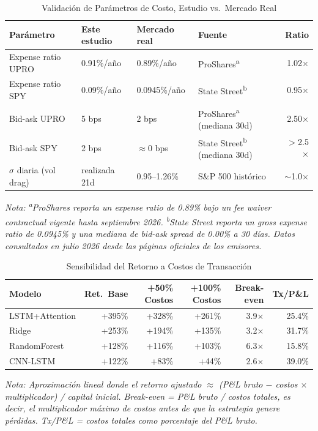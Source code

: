 

\begin{table}[H]
\centering
\caption{Validaci\'on de Par\'ametros de Costo, Estudio vs.\ Mercado Real}
\label{tab:cost_validation}
\small
\begin{tabular}{@{}llllr@{}}
\toprule
\textbf{Par\'ametro} & \textbf{Este estudio} & \textbf{Mercado real} & \textbf{Fuente} & \textbf{Ratio} \\
\midrule
Expense ratio UPRO & 0.91\%/a\~no & 0.89\%/a\~no & ProShares\textsuperscript{a} & 1.02$\times$ \\
Expense ratio SPY & 0.09\%/a\~no & 0.0945\%/a\~no & State Street\textsuperscript{b} & 0.95$\times$ \\
Bid-ask UPRO & 5 bps & 2 bps & ProShares\textsuperscript{a} (mediana 30d) & 2.50$\times$ \\
Bid-ask SPY & 2 bps & $\approx$0 bps & State Street\textsuperscript{b} (mediana 30d) & $>$2.5$\times$ \\
$\sigma$ diaria (vol drag) & realizada 21d & 0.95--1.26\% & S\&P 500 hist\'orico & $\sim$1.0$\times$ \\
\bottomrule
\end{tabular}
\vspace{0.2cm}
\parbox{0.9\textwidth}{\footnotesize\textit{Nota: \textsuperscript{a}ProShares reporta un expense ratio de 0.89\% bajo un fee waiver contractual vigente hasta septiembre 2026. \textsuperscript{b}State Street reporta un gross expense ratio de 0.0945\% y una mediana de bid-ask spread de 0.00\% a 30 d\'ias. Datos consultados en julio 2026 desde las p\'aginas oficiales de los emisores.}}
\end{table}

\begin{table}[H]
\centering
\caption{Sensibilidad del Retorno a Costos de Transacci\'on}
\label{tab:cost_sensitivity}
\small
\begin{tabular}{@{}lrrrrr@{}}
\toprule
\textbf{Modelo} & \textbf{Ret.\ Base} & \textbf{+50\% Costos} & \textbf{+100\% Costos} & \textbf{Break-even} & \textbf{Tx/P\&L} \\
\midrule
LSTM+Attention & +395\% & +328\% & +261\% & 3.9$\times$ & 25.4\% \\
Ridge & +253\% & +194\% & +135\% & 3.2$\times$ & 31.7\% \\
RandomForest & +128\% & +116\% & +103\% & 6.3$\times$ & 15.8\% \\
CNN-LSTM & +122\% & +83\% & +44\% & 2.6$\times$ & 39.0\% \\
\bottomrule
\end{tabular}
\vspace{0.2cm}
\parbox{0.9\textwidth}{\footnotesize\textit{Nota: Aproximaci\'on lineal donde el retorno ajustado $\approx$ (P\&L bruto $-$ costos $\times$ multiplicador) / capital inicial. Break-even = P\&L bruto / costos totales, es decir, el multiplicador m\'aximo de costos antes de que la estrategia genere p\'erdidas. Tx/P\&L = costos totales como porcentaje del P\&L bruto.}}
\end{table}

